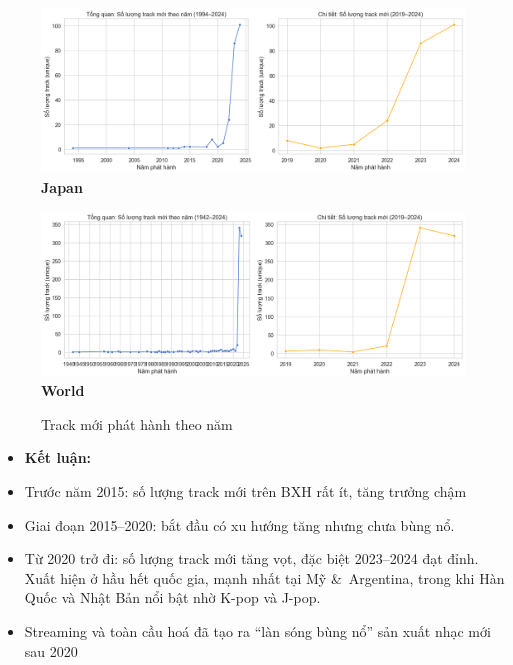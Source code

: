 \begin{itemize}
\begin{figure}[H]
        \begin{minipage}{0.45\textwidth}
            \centering
            \includegraphics[width=\linewidth]{../graphics/data_top50/figure/10/EDA_japan.png}
            \\[4pt] {\small \textbf{Japan}}
        \end{minipage}
        \hfill
        \begin{minipage}{0.45\textwidth}
            \centering
            \includegraphics[width=\linewidth]{../graphics/data_top50/figure/10/EDA_world.png}
            \\[4pt] {\small \textbf{World}}
        \end{minipage}

        \caption{Track mới phát hành theo năm}
        \label{fig:energy-regions}
    \end{figure}
    
           \begin{itemize}
               \item \textbf{ Kết luận: }
               \item Trước năm 2015: số lượng track mới trên BXH rất ít, tăng trưởng chậm
               \item Giai đoạn 2015–2020: bắt đầu có xu hướng tăng nhưng chưa bùng nổ.
               \item Từ 2020 trở đi: số lượng track mới tăng vọt, đặc biệt 2023–2024 đạt đỉnh. Xuất hiện ở hầu hết quốc gia, mạnh nhất tại Mỹ \&\ Argentina, trong khi Hàn Quốc và Nhật Bản nổi bật nhờ K-pop và J-pop.
               \item Streaming và toàn cầu hoá đã tạo ra “làn sóng bùng nổ” sản xuất nhạc mới sau 2020
           \end{itemize}



\end{itemize}
